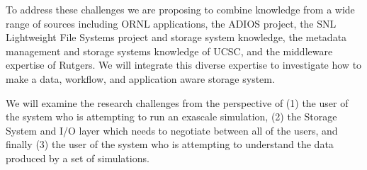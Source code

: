 To address these challenges we are proposing to combine knowledge
from a wide range of sources including ORNL applications, the ADIOS project,
the SNL Lightweight File Systems project and storage system knowledge, the metadata
management and storage systems knowledge of UCSC, and the middleware expertise
of Rutgers. We will integrate this diverse expertise to investigate how to make
a data, workflow, and application aware storage system.




We will examine the research challenges from the perspective of
%
(1) the user of the system who is attempting to run an exascale simulation,
%
(2) the Storage System and I/O layer which needs to negotiate between all of
the users, and finally
%
(3) the user of the system who is attempting to understand the data
produced by a set of simulations.

